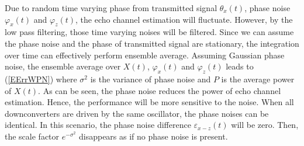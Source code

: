 \documentclass[twocolumn]{IEEEtran}
\begin{document}
Due to random time varying phase from transmitted signal
$\theta_x(t)$, phase noise $\varphi_x(t)$ and $\varphi_z(t)$, the
echo channel estimation will fluctuate. However, by the low pass
filtering, those time varying noises will be filtered. Since we can
assume the phase noise and the phase of transmitted signal are
stationary, the integration over time can effectively perform
ensemble average. Assuming Gaussian phase noise, the ensemble
average over $X(t)$, $\varphi_x(t)$ and $\varphi_z(t)$ leads to
(\ref{EErrWPN}) where $\sigma^2$ is the variance of phase noise and
$P$ is the average power of $X(t)$. As can be seen, the phase noise
reduces the power of echo channel estimation. Hence, the performance
will be more sensitive to the noise. When all downconverters are
driven by the same oscillator, the phase noises can be identical. In
this scenario, the phase noise difference $\varepsilon_{x-z}(t)$
will be zero. Then, the scale factor $e^{-\sigma^2}$ disappears as
if no phase noise is present.



 \nocite{*}

\end{document}
